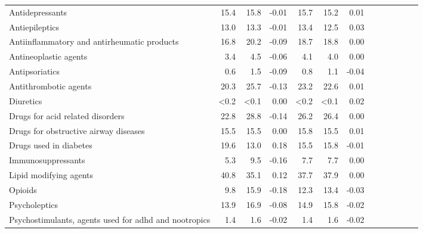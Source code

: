 \documentclass[11pt,]{article}
\begin{document}
\begin{longtable}{lrrrrrrrrrrrr}
      Antidepressants & 15.4 & 15.8 & -0.01 & 15.7 & 15.2 &  0.01 \\ 
      Antiepileptics & 13.0 & 13.3 & -0.01 & 13.4 & 12.5 &  0.03 \\ 
      Antiinflammatory and antirheumatic products & 16.8 & 20.2 & -0.09 & 18.7 & 18.8 &  0.00 \\ 
      Antineoplastic agents &  3.4 &  4.5 & -0.06 &  4.1 &  4.0 &  0.00 \\ 
      Antipsoriatics &  0.6 &  1.5 & -0.09 &  0.8 &  1.1 & -0.04 \\ 
      Antithrombotic agents & 20.3 & 25.7 & -0.13 & 23.2 & 22.6 &  0.01 \\ 
      Diuretics & <0.2 & <0.1 &  0.00 & <0.2 & <0.1 &  0.02 \\ 
      Drugs for acid related disorders & 22.8 & 28.8 & -0.14 & 26.2 & 26.4 &  0.00 \\ 
      Drugs for obstructive airway diseases & 15.5 & 15.5 &  0.00 & 15.8 & 15.5 &  0.01 \\ 
      Drugs used in diabetes & 19.6 & 13.0 &  0.18 & 15.5 & 15.8 & -0.01 \\ 
      Immunosuppressants &  5.3 &  9.5 & -0.16 &  7.7 &  7.7 &  0.00 \\ 
      Lipid modifying agents & 40.8 & 35.1 &  0.12 & 37.7 & 37.9 &  0.00 \\ 
      Opioids &  9.8 & 15.9 & -0.18 & 12.3 & 13.4 & -0.03 \\ 
      Psycholeptics & 13.9 & 16.9 & -0.08 & 14.9 & 15.8 & -0.02 \\ 
      Psychostimulants, agents used for adhd and nootropics &  1.4 &  1.6 & -0.02 &  1.4 &  1.6 & -0.02 \\ 
   \bottomrule\end{longtable}
\clearpage
{}
\end{document}

